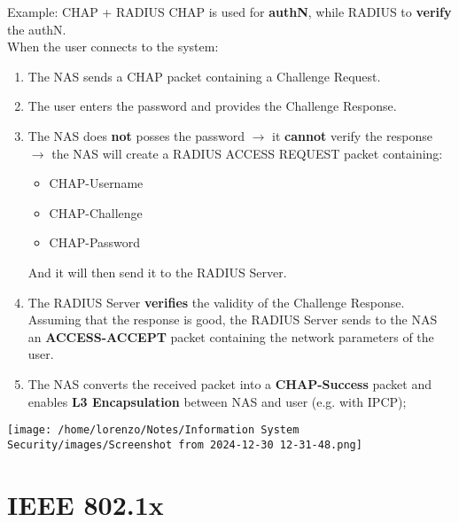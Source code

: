\begin{center}
\begin{quotebox-grey}{Example: CHAP + RADIUS}
CHAP is used for \textbf{authN}, while RADIUS to \textbf{verify} the authN.\\
When the user connects to the system:
\begin{enumerate}
    \item The NAS sends a CHAP packet containing a Challenge Request.
    \item The user enters the password and provides the Challenge Response.
    \item The NAS does \textbf{not} posses the password \(\rightarrow \) it \textbf{cannot} verify the response \(\rightarrow \) the NAS will create a RADIUS ACCESS REQUEST packet containing:
    \begin{itemize}
        \item CHAP-Username
        \item CHAP-Challenge
        \item CHAP-Password
    \end{itemize}
    And it will then send it to the RADIUS Server.
    \item The RADIUS Server \textbf{verifies} the validity of the Challenge Response. Assuming that the
    response is good, the RADIUS Server sends to the NAS an \textbf{ACCESS-ACCEPT} packet containing the network parameters of the user.
    \item The NAS converts the received packet into a \textbf{CHAP-Success} packet and enables \textbf{L3
    Encapsulation} between NAS and user (e.g. with IPCP);
\end{enumerate}
    \vspace{0.2cm}
    \centering
    \texttt{[image: /home/lorenzo/Notes/Information System Security/images/Screenshot from 2024-12-30 12-31-48.png]}
\end{quotebox-grey}
\end{center}
\newpage
\section{IEEE 802.1x}